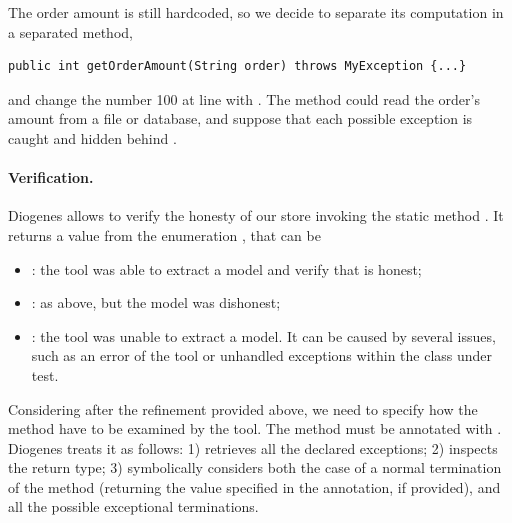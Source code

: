 The order amount is still hardcoded, so we decide to separate its computation
in a separated method, \eg
\begin{mdframed}
\begin{verbatim}
public int getOrderAmount(String order) throws MyException {...}
\end{verbatim}
\end{mdframed}
and change the number 100 at line  with .
The method could read the order's amount from a file or database,
and suppose that each possible exception
is caught and hidden behind . 

\paragraph{Verification.}
Diogenes allows to verify the honesty of our store
invoking the static method
.
%
It returns a value from the enumeration , that can be
\begin{itemize}
\item {}: the tool was able to extract a \coco model and verify that is honest;
\item {}: as above, but the model was dishonest;
\item {}: the tool was unable to extract a model. 
It can be caused by several issues, such as an error of the 
tool or unhandled exceptions within the class under test.
\end{itemize}

Considering  after the refinement provided above,
we need to specify how the method have to be examined by the tool.
The method must be annotated with .
Diogenes treats it as follows:
1) retrieves all the declared exceptions;
2) inspects the return type;
3) symbolically considers both the case of a normal termination of the method
(returning the value specified in the annotation, if provided),
and all the possible exceptional terminations.

